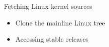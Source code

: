 \setuplabframe
{Fetching Linux kernel sources}
{
  \begin{itemize}
  \item Clone the mainline Linux tree
  \item Accessing stable releases
  \end{itemize}
}
